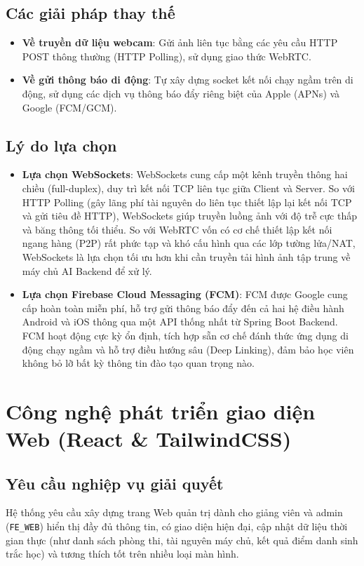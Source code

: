 \documentclass[../DoAn.tex]{subfiles}
\begin{document}
\subsection{Các giải pháp thay thế}
\begin{itemize}
    \item \textbf{Về truyền dữ liệu webcam}: Gửi ảnh liên tục bằng các yêu cầu HTTP POST thông thường (HTTP Polling), sử dụng giao thức WebRTC.
    \item \textbf{Về gửi thông báo di động}: Tự xây dựng socket kết nối chạy ngầm trên di động, sử dụng các dịch vụ thông báo đẩy riêng biệt của Apple (APNs) và Google (FCM/GCM).
\end{itemize}

\subsection{Lý do lựa chọn}
\begin{itemize}
    \item \textbf{Lựa chọn WebSockets}: WebSockets cung cấp một kênh truyền thông hai chiều (full-duplex), duy trì kết nối TCP liên tục giữa Client và Server. So với HTTP Polling (gây lãng phí tài nguyên do liên tục thiết lập lại kết nối TCP và gửi tiêu đề HTTP), WebSockets giúp truyền luồng ảnh với độ trễ cực thấp và băng thông tối thiểu. So với WebRTC vốn có cơ chế thiết lập kết nối ngang hàng (P2P) rất phức tạp và khó cấu hình qua các lớp tường lửa/NAT, WebSockets là lựa chọn tối ưu hơn khi cần truyền tải hình ảnh tập trung về máy chủ AI Backend để xử lý.
    \item \textbf{Lựa chọn Firebase Cloud Messaging (FCM)}: FCM \cite{fcm2026} được Google cung cấp hoàn toàn miễn phí, hỗ trợ gửi thông báo đẩy đến cả hai hệ điều hành Android và iOS thông qua một API thống nhất từ Spring Boot Backend. FCM hoạt động cực kỳ ổn định, tích hợp sẵn cơ chế đánh thức ứng dụng di động chạy ngầm và hỗ trợ điều hướng sâu (Deep Linking), đảm bảo học viên không bỏ lỡ bất kỳ thông tin đào tạo quan trọng nào.
\end{itemize}

\section{Công nghệ phát triển giao diện Web (React \& TailwindCSS)}
\label{section:3.7}

\subsection{Yêu cầu nghiệp vụ giải quyết}
Hệ thống yêu cầu xây dựng trang Web quản trị dành cho giảng viên và admin (\mbox{\texttt{FE\_WEB}}) hiển thị đầy đủ thông tin, có giao diện hiện đại, cập nhật dữ liệu thời gian thực (như danh sách phòng thi, tài nguyên máy chủ, kết quả điểm danh sinh trắc học) và tương thích tốt trên nhiều loại màn hình.
\end{document}
